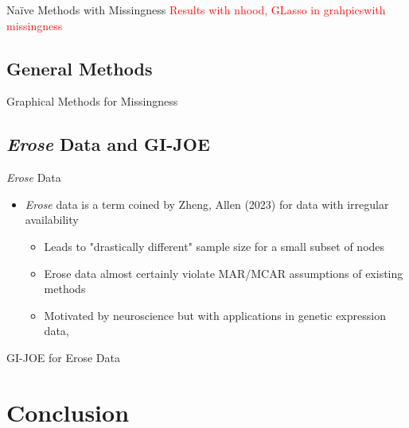 \documentclass{beamer}
\begin{document}
\begin{frame}{Na\"ive Methods with Missingness}
    \textcolor{red}{Results with nhood, GLasso in grahpicswith missingness}
\end{frame}

\subsection{General Methods}

\begin{frame}{Graphical Methods for Missingness}
\end{frame}

\subsection{{\it Erose} Data and GI-JOE}



\begin{frame}{{\it Erose} Data}
    \begin{itemize}
        \item {\it Erose} data is a term coined by Zheng, Allen (2023) for data with irregular availability \cite{zheng_gi-joe_2023}
        \begin{itemize}
            \item Leads to "drastically different" sample size for a small subset of nodes 
            \item Erose data almost certainly violate MAR/MCAR assumptions of existing methods 
            \item Motivated by neuroscience but with applications in genetic expression data, 
        \end{itemize}
    \end{itemize} 
\end{frame}


\begin{frame}{GI-JOE for Erose Data}
\end{frame}


\section*{Conclusion}
\end{document}
